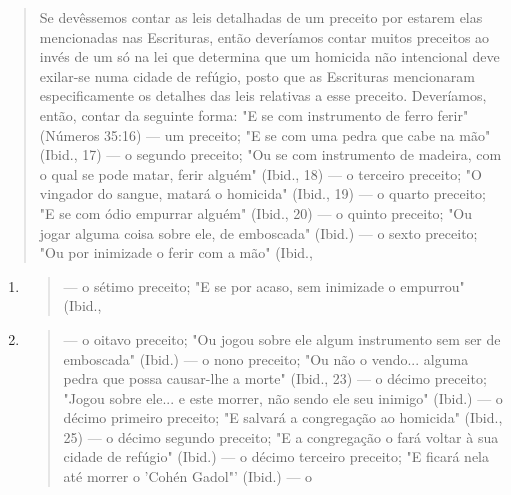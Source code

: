 \begin{quote}
Se devêssemos contar as leis detalhadas de um preceito por estarem elas
mencionadas nas Escrituras, então deveríamos contar muitos preceitos ao
invés de um só na lei que determina que um homicida não intencional deve
exilar-se numa cidade de refúgio, posto que as Escrituras mencionaram
especi­ficamente os detalhes das leis relativas a esse preceito.
Deveríamos, então, con­tar da seguinte forma: "E se com instrumento de
ferro ferir" (Números 35:16) --- um preceito; "E se com uma pedra que
cabe na mão" (Ibid., 17) --- o segun­do preceito; "Ou se com instrumento
de madeira, com o qual se pode matar, ferir alguém" (Ibid., 18) --- o
terceiro preceito; "O vingador do sangue, matará o homicida" (Ibid., 19)
--- o quarto preceito; "E se com ódio empurrar alguém" (Ibid., 20) --- o
quinto preceito; "Ou jogar alguma coisa sobre ele, de embosca­da"
(Ibid.) --- o sexto preceito; "Ou por inimizade o ferir com a mão"
(Ibid.,
\end{quote}

\begin{enumerate}
\def\labelenumi{\arabic{enumi})}
\setcounter{enumi}{20}
\item
  \begin{quote}
  --- o sétimo preceito; "E se por acaso, sem inimizade o empurrou"
  (Ibid.,
  \end{quote}
\item
  \begin{quote}
  --- o oitavo preceito; "Ou jogou sobre ele algum instrumento sem ser
  de emboscada" (Ibid.) --- o nono preceito; "Ou não o vendo... alguma
  pedra que possa causar-lhe a morte" (Ibid., 23) --- o décimo preceito;
  "Jogou sobre ele... e este morrer, não sendo ele seu inimigo" (Ibid.)
  --- o décimo primeiro precei­to; "E salvará a congregação ao homicida"
  (Ibid., 25) --- o décimo segundo pre­ceito; "E a congregação o fará
  voltar à sua cidade de refúgio" (Ibid.) --- o déci­mo terceiro
  preceito; "E ficará nela até morrer o 'Cohén Gadol"' (Ibid.) --- o
  \end{quote}
\end{enumerate}

